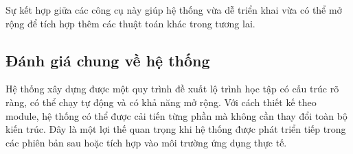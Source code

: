 Sự kết hợp giữa các công cụ này giúp hệ thống vừa dễ triển khai vừa có thể mở rộng để tích hợp thêm các thuật toán khác trong tương lai.

\subsection{Đánh giá chung về hệ thống}

Hệ thống xây dựng được một quy trình đề xuất lộ trình học tập có cấu trúc rõ ràng, có thể chạy tự động và có khả năng mở rộng. Với cách thiết kế theo module, hệ thống có thể được cải tiến từng phần mà không cần thay đổi toàn bộ kiến trúc. Đây là một lợi thế quan trọng khi hệ thống được phát triển tiếp trong các phiên bản sau hoặc tích hợp vào môi trường ứng dụng thực tế.
